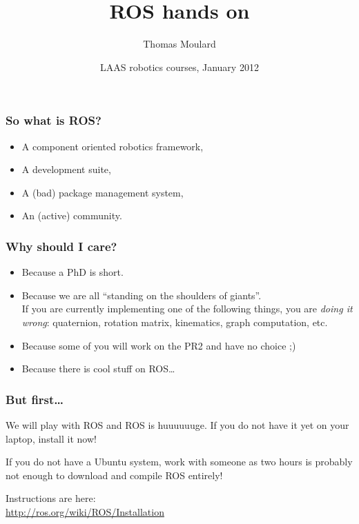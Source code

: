 \documentclass[hyperref={pdfpagelabels=false}]{beamer}
\title{ROS hands on}
\author[T. Moulard]{Thomas Moulard}
\date[January 2012]{LAAS robotics courses, January 2012}
\begin{document}
\maketitle

\begin{frame}
  \frametitle{So what is ROS?}

  \begin{itemize}
    \item A component oriented robotics framework,
    \item A development suite,
    \item A (bad) package management system,
    \item An (active) community.
  \end{itemize}
\end{frame}

\begin{frame}
  \frametitle{Why should I care?}

  \begin{itemize}
    \item Because a PhD is short.

    \item Because we are all ``standing on the shoulders of
      giants''.\\ If you are currently implementing one of the
      following things, you are \textit{doing it wrong}: quaternion,
      rotation matrix, kinematics, graph computation, etc.

      \item Because some of you will work on the PR2 and have no
        choice ;)

      \item Because there is cool stuff on ROS\ldots
  \end{itemize}
\end{frame}

\begin{frame}
  \frametitle{But first\ldots}

  We will play with ROS and ROS is huuuuuuge. If you do not have it
  yet on your laptop, install it now!

  If you do not have a Ubuntu system, work with someone as two hours
  is probably not enough to download and compile ROS entirely!

  \vspace{0.5cm}

  Instructions are here:\\
  \url{http://ros.org/wiki/ROS/Installation}
\end{frame}
\end{document}
